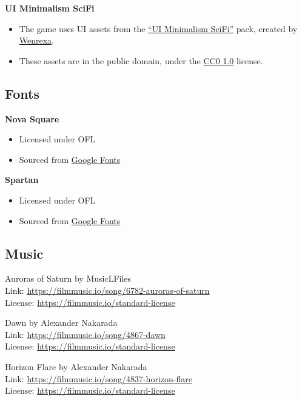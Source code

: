 \documentclass[10pt]{article}
\begin{document}
\textbf{UI Minimalism SciFi}
\begin{itemize}
    \item The game uses UI assets from the \href{https://opengameart.org/content/assets-ui-minimalism-scifi}{``UI Minimalism SciFi''} pack,
        created by \href{https://wenrexa.itch.io/}{Wenrexa}.
    \item These assets are in the public domain, under the \href{https://creativecommons.org/publicdomain/zero/1.0/}{CC0 1.0} license.
\end{itemize}

\pagebreak

\subsection{Fonts}

\textbf{Nova Square}
\begin{itemize}
    \item Licensed under OFL
    \item Sourced from \href{https://fonts.google.com/specimen/Nova+Square}{Google Fonts}
\end{itemize}

\textbf{Spartan}
\begin{itemize}
    \item Licensed under OFL
    \item Sourced from \href{https://fonts.google.com/specimen/Spartan}{Google Fonts}
\end{itemize}

\subsection{Music}

Auroras of Saturn by MusicLFiles\\
Link: \url{https://filmmusic.io/song/6782-auroras-of-saturn}\\
License: \url{https://filmmusic.io/standard-license}

Dawn by Alexander Nakarada\\
Link: \url{https://filmmusic.io/song/4867-dawn}\\
License: \url{https://filmmusic.io/standard-license}

Horizon Flare by Alexander Nakarada\\
Link: \url{https://filmmusic.io/song/4837-horizon-flare}\\
License: \url{https://filmmusic.io/standard-license}
\end{document}
